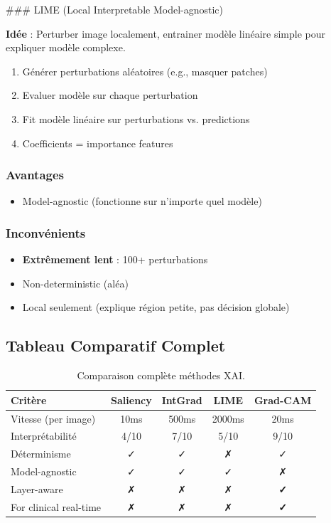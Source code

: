 \documentclass[12pt,a4paper,oneside]{report}
\begin{document}
### LIME (Local Interpretable Model-agnostic)

\textbf{Idée} : Perturber image localement, entrainer modèle linéaire 
simple pour expliquer modèle complexe.

\begin{enumerate}
    \item Générer perturbations aléatoires (e.g., masquer patches)
    \item Evaluer modèle sur chaque perturbation
    \item Fit modèle linéaire sur perturbations vs. predictions
    \item Coefficients = importance features
\end{enumerate}

\subsubsection{Avantages}

\begin{itemize}
    \item Model-agnostic (fonctionne sur n'importe quel modèle)
\end{itemize}

\subsubsection{Inconvénients}

\begin{itemize}
    \item \textbf{Extrêmement lent} : 100+ perturbations
    \item Non-deterministic (aléa)
    \item Local seulement (explique région petite, pas décision globale)
\end{itemize}

\subsection{Tableau Comparatif Complet}

\begin{table}[H]
\centering
\begin{tabular}{|l|c|c|c|c|}
\hline
\textbf{Critère} & \textbf{Saliency} & \textbf{IntGrad} & 
\textbf{LIME} & \textbf{Grad-CAM} \\
\hline
Vitesse (per image) & 10ms & 500ms & 2000ms & 20ms \\
Interprétabilité & 4/10 & 7/10 & 5/10 & 9/10 \\
Déterminisme & ✓ & ✓ & ✗ & ✓ \\
Model-agnostic & ✓ & ✓ & ✓ & ✗ \\
Layer-aware & ✗ & ✗ & ✗ & \textbf{✓} \\
For clinical real-time & ✗ & ✗ & ✗ & \textbf{✓} \\
\hline
\end{tabular}
\caption{Comparaison complète méthodes XAI.}
\label{tab:xai_comparison_full}
\end{table}
\end{document}
